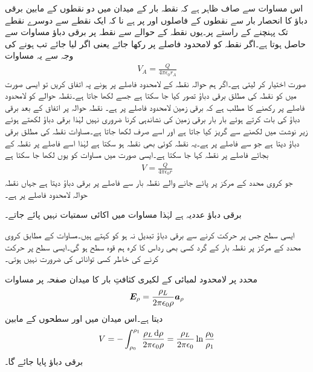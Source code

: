 اس مساوات سے صاف ظاہر ہے کہ نقطہ بار  کے میدان میں دو نقطوں کے مابین برقی دباؤ کا انحصار بار سے نقطوں کے فاصلوں  اور  پر ہے نا کہ ایک نقطے سے دوسرے نقطے تک پہنچنے کے راستے پر۔یوں نقطہ  کے حوالے سے نقطہ  پر برقی دباؤ مساوات  سے حاصل ہوتا ہے۔اگر نقطہ  کو لامحدود فاصلے پر رکھا جائے یعنی اگر  لیا جائے تب  ہونے کی وجہ سے  یہ مساوات
\begin{align}\label{مساوات_توانائی_نقطہ_بار_کی_حتمی_دباو}
V_{A}=\frac{Q}{4\pi \epsilon_0 r_A}
\end{align}
صورت اختیار کر لیتی ہے۔اگر ہم  حوالہ نقطہ کے لامحدود فاصلے پر ہونے پہ اتفاق کریں تو ایسی صورت میں  کو نقطہ  کی مطلق برقی دباؤ تصور کیا جا سکتا ہے جسے  لکھا جاتا ہے۔نقطہ حوالے کو لامحدود فاصلے پر رکھنے کا مطلب ہے کہ برقی زمین لامحدود فاصلے پر ہے۔ نقطہ حوالہ پر اتفاق کے بعد برقی دباؤ کی بات کرتے ہوئے بار بار برقی زمین کی نشاندہی کرنا ضروری نہیں لہٰذا برقی دباؤ لکھتے ہوئے زیر نوشت میں  لکھنے سے گریز کیا جاتا ہے اور اسے صرف  لکھا جاتا ہے۔مساوات  نقطہ  کی مطلق برقی دباؤ دیتا ہے جو  سے  فاصلے پر ہے۔یہ نقطہ کوئی بھی نقطہ ہو سکتا ہے لہٰذا  اسے   فاصلے پر نقطہ  کے بجائے  فاصلے پر نقطہ کہا جا سکتا ہے۔ایسی صورت میں مساوات  کو یوں لکھا جا سکتا ہے
\begin{align}\label{مساوات_توانائی_نقطہ_بار_کی_حتمی_دباو_الف}
V=\frac{Q}{4\pi \epsilon_0 r}
\end{align}
جو کروی محدد کے مرکز پر پائے جانے والے نقطہ بار  سے  فاصلے پر برقی دباؤ  دیتا ہے جہاں نقطہ حوالہ لامحدود فاصلے پر ہے۔

برقی دباؤ عددیہ ہے لہٰذا مساوات  میں اکائی سمتیات نہیں پائے جاتے۔

ایسی سطح جس پر حرکت کرنے سے برقی دباؤ تبدیل نہ ہو کو  کہتے ہیں۔مساوات  کے مطابق کروی محدد کے مرکز پر نقطہ بار کے گرد کسی بھی رداس کا کرہ ہم قوہ سطح ہو گی۔ایسی سطح پر حرکت کرنے کی خاطر کسی توانائی کی ضرورت نہیں ہوتی۔

 محدد پر لامحدود لمبائی کے لکیری کثافتِ بار کا میدان صفحہ  پر مساوات 
\begin{align*}
{\ensuremath{{\boldsymbol{E}}}}_\rho=\frac{\rho_L}{2\pi \epsilon_0\rho} {\boldsymbol{a}}_{\rho}
\end{align*}
دیتا ہے۔اس میدان میں  اور  سطحوں کے مابین
\begin{align}\label{مساوات_توانائی_لکیری_بار_برقی_دباو}
V=-\int_{\rho_0}^{\rho_1} \frac{\rho_L  \dif \rho}{2\pi \epsilon_0\rho} =\frac{\rho_L}{2\pi\epsilon_0} \ln \frac{\rho_0}{\rho_1}
\end{align}
برقی دباؤ پایا جائے گا۔ 

